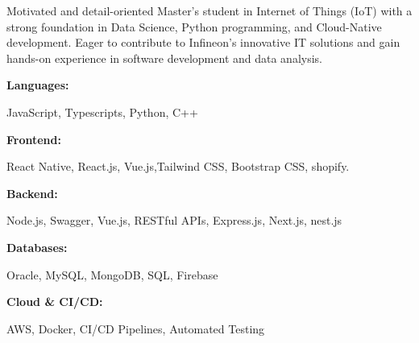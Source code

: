 \documentclass[9pt]{developercv}
\begin{document}
\begin{minipage}[t]{0.5\textwidth}
    \vspace{-1pt}
    Motivated and detail-oriented Master’s student in Internet of Things (IoT) with a strong foundation in Data Science, Python programming, and Cloud-Native development. Eager to contribute to Infineon's innovative IT solutions and gain hands-on experience in software development and data analysis.
\end{minipage}
\hfill %
\begin{minipage}[t]{0.465\textwidth}
    \vspace{0.5pt}

    \begin{minipage}[t]{1\textwidth}
        \textbf{Languages:}
    \end{minipage}
    \hfill
    \begin{minipage}[t]{1\textwidth}
        JavaScript, Typescripts, Python, C++\end{minipage}

    \begin{minipage}[t]{1\textwidth}
        \textbf{Frontend:}
    \end{minipage}
    \hfill
    \begin{minipage}[t]{1\textwidth}
        React Native, React.js, Vue.js,Tailwind CSS, Bootstrap CSS, shopify. \end{minipage}
    \begin{minipage}[t]{1\textwidth}
        \textbf{Backend:}
    \end{minipage}
    \hfill
    \begin{minipage}[t]{1\textwidth}
        Node.js, Swagger, Vue.js, RESTful APIs, Express.js, Next.js, nest.js
    \end{minipage}

    \begin{minipage}[t]{1\textwidth}
        \textbf{Databases:}
    \end{minipage}
    \hfill
    \begin{minipage}[t]{1\textwidth}
        Oracle, MySQL, MongoDB, SQL, Firebase
    \end{minipage}
    \begin{minipage}[t]{1\textwidth}
        \textbf{Cloud \& CI/CD:}
    \end{minipage}
    \hfill
    \begin{minipage}[t]{1\textwidth}
        AWS, Docker, CI/CD Pipelines, Automated Testing
    \end{minipage}
\end{minipage}
\end{document}
